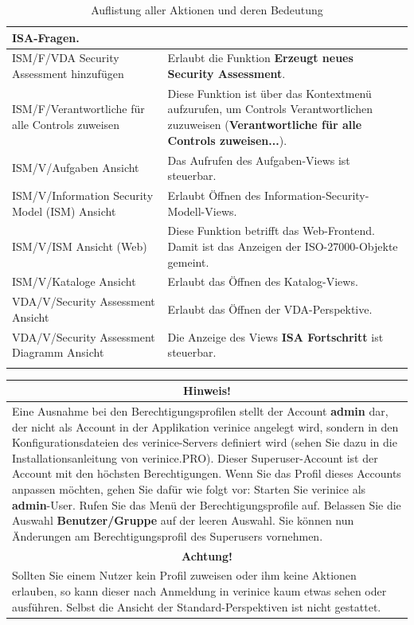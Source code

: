 \documentclass[a4paper,10pt]{book}
\begin{document}
\begin{longtable}{| p{5cm} | p{6cm} |}
ISA-Fragen. \\[10pt] \hline
ISM/F/VDA Security Assessment hinzufügen & Erlaubt die Funktion \textbf{Erzeugt
neues Security Assessment}. \\[10pt] \hline
ISM/F/Verantwortliche für alle Controls zuweisen & Diese Funktion ist über das
Kontextmenü aufzurufen, um Controls Verantwortlichen zuzuweisen
(\textbf{Verantwortliche für alle Controls zuweisen...}). \\[10pt] \hline
ISM/V/Aufgaben Ansicht & Das Aufrufen des Aufgaben-Views ist steuerbar.
\\[10pt] \hline
ISM/V/Information Security Model (ISM) Ansicht & Erlaubt Öffnen des
Information-Security-Modell-Views. \\[10pt] \hline
ISM/V/ISM Ansicht (Web) & Diese Funktion betrifft das Web-Frontend. Damit ist
das Anzeigen der ISO-27000-Objekte gemeint. \\[10pt] \hline
ISM/V/Kataloge Ansicht & Erlaubt das Öffnen des Katalog-Views. \\[10pt] \hline
VDA/V/Security Assessment Ansicht & Erlaubt das Öffnen der VDA-Perspektive.
\\[10pt] \hline
VDA/V/Security Assessment Diagramm Ansicht & Die Anzeige des Views \textbf{ISA
Fortschritt} ist steuerbar. \\[10pt] \hline
\caption{Auflistung aller Aktionen und deren Bedeutung}
\end{longtable}
\newpage
\begin{longtable}{| p{} |}
\hline
\multicolumn{1}{|c|}{\textbf{Hinweis!}} \\[10pt]
\hline\hline
Eine Ausnahme bei den Berechtigungsprofilen stellt der Account \textbf{admin} dar, der nicht als Account in der Applikation verinice angelegt wird,
sondern in den Konfigurationsdateien des verinice-Servers definiert wird (sehen Sie dazu in die Installationsanleitung von verinice.\textsc{PRO}).
Dieser Superuser-Account ist der Account mit den höchsten Berechtigungen.
Wenn Sie das Profil dieses Accounts anpassen möchten, gehen Sie dafür wie folgt vor: Starten Sie verinice als \textbf{admin}-User.
Rufen Sie das Menü der Berechtigungsprofile auf. Belassen Sie die Auswahl \textbf{Benutzer/Gruppe} auf der leeren Auswahl.
Sie können nun Änderungen am Berechtigungsprofil des Superusers vornehmen. \\[10pt] \hline
\multicolumn{1}{|c|}{\textbf{Achtung!}} \\[10pt]
\hline
Sollten Sie einem Nutzer kein Profil zuweisen oder ihm keine Aktionen erlauben, so kann dieser nach
Anmeldung in verinice kaum etwas sehen oder ausführen. Selbst die Ansicht der Standard-Perspektiven ist nicht gestattet. \\[10pt] \hline
\end{longtable}
\end{document}
